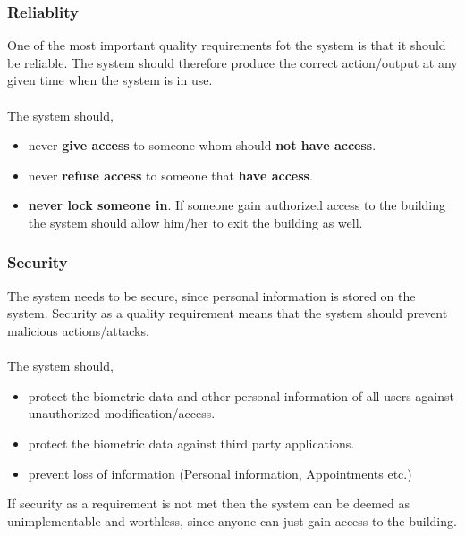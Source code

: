 \subsubsection{Reliablity}
One of the most important quality requirements fot the system is that it should be reliable.
The system should therefore produce the correct action/output at any given time when the system is in use.\\
\\The system should,
\begin{itemize}
	\item  never \textbf{give access} to someone whom should \textbf{not have access}.
	\item  never \textbf{refuse access} to someone that\textbf{ have access}. 
	\item  \textbf{never lock someone in}. If someone gain authorized access to the building the system should 				allow him/her to exit the building as well.
\end{itemize}

\subsubsection{Security}
The system needs to be secure, since personal information is stored on the system. Security as a quality requirement means that the system should prevent malicious actions/attacks.\\
\\The system should,
\begin{itemize}
	\item  protect the biometric data and other personal information of all users against unauthorized modification/access.
	\item  protect the biometric data against third party applications.
	\item  prevent loss of information (Personal information, Appointments etc.)
\end{itemize}

If security as a requirement is not met then the system can be deemed as unimplementable and worthless, since anyone can just gain access to the building.

